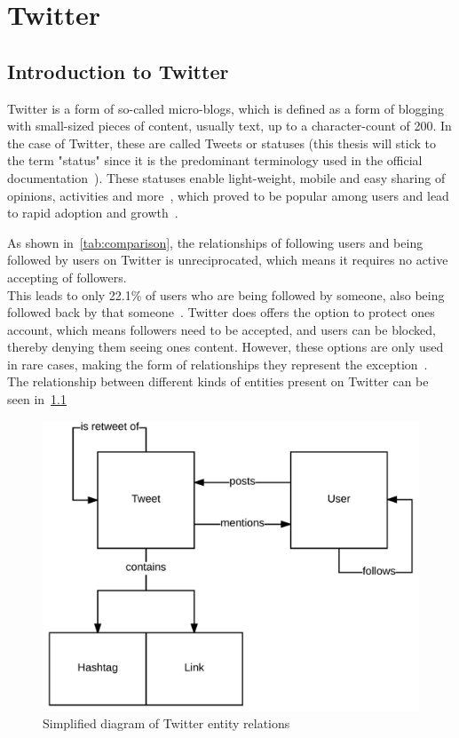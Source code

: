 \chapter{Twitter}
\label{ch:twitter}

\section{Introduction to Twitter}
\label{sec:twitter}

Twitter is a form of so-called micro-blogs, which is defined as a form of blogging with small-sized pieces of content,
usually text, up to a character-count of 200.
In the case of Twitter, these are called Tweets or statuses
(this thesis will stick to the term "status" since it is the predominant terminology used in the official documentation~\cite{twitterDocs}).
These statuses enable light-weight, mobile and easy sharing of opinions, activities and more~\cite{Finin2007},
which proved to be popular among users and lead to rapid adoption and growth~\cite{mcgiboney2009twitter}.

As shown in~\cref{tab:comparison}, the relationships of following users and being followed by users on Twitter is unreciprocated,
which means it requires no active accepting of followers.\\
This leads to only 22.1\% of users who are being followed by someone, also being followed back by that someone~\cite{Kwak2010}.
Twitter does offers the option to protect ones account, which means followers need to be accepted,
and users can be blocked, thereby denying them seeing ones content.
However, these options are only used in rare cases, making the form of relationships they represent the exception~\cite{Kwak2010}.\\
The relationship between different kinds of entities present on Twitter can be seen in~\cref{fig:twitter}

\begin{figure}[htb]
    \caption{Simplified diagram of Twitter entity relations}
    \label{fig:twitter}
    \centering
    \includegraphics[width=\textwidth]{../figures/twitter_er.pdf}
\end{figure}

